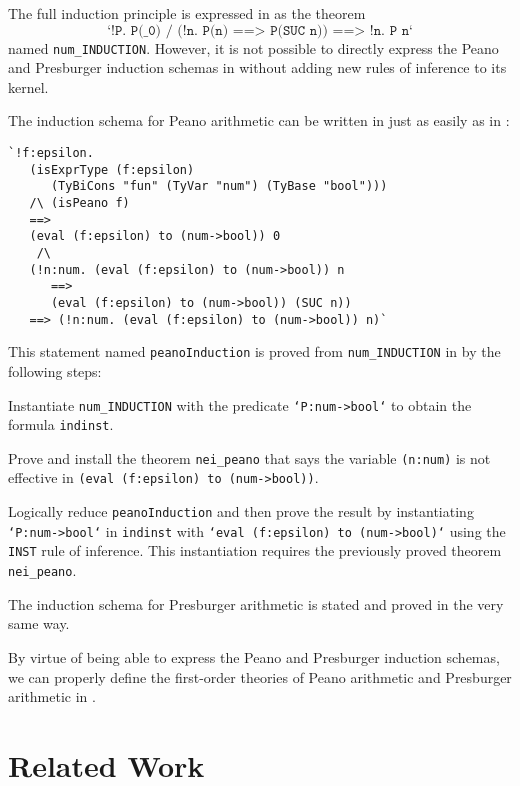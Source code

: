 \documentclass[fleqn]{llncs}
\begin{document}
The full induction principle is expressed in {\HL} as the
theorem \[\texttt{`!P. P(\_0) /\ (!n. P(n) ==> P(SUC n)) ==> !n. P
  n`}\] named \texttt{num\_INDUCTION}.  However, it is not possible to
directly express the Peano and Presburger induction schemas in {\HL}
without adding new rules of inference to its kernel.

\bsp
The induction schema for Peano arithmetic can be written in
{\HLQE} just as easily as in {\churchqe}:
\begin{lstlisting}
`!f:epsilon. 
   (isExprType (f:epsilon) 
      (TyBiCons "fun" (TyVar "num") (TyBase "bool"))) 
   /\ (isPeano f) 
   ==> 
   (eval (f:epsilon) to (num->bool)) 0 
    /\ 
   (!n:num. (eval (f:epsilon) to (num->bool)) n 
      ==> 
      (eval (f:epsilon) to (num->bool)) (SUC n)) 
   ==> (!n:num. (eval (f:epsilon) to (num->bool)) n)`
\end{lstlisting}
\esp

This statement named \texttt{peanoInduction} is proved from
\texttt{num\_INDUCTION} in {\HLQE} by the following steps:

\bsp
\be

  \item Instantiate \texttt{num\_INDUCTION} with the predicate
    \texttt{`P:num->bool`} to obtain the formula \texttt{indinst}.

  \item Prove and install the theorem \texttt{nei\_peano} that says the
    variable \texttt{(n:num)} is not effective in \texttt{(eval
      (f:epsilon) to (num->bool))}.

  \item Logically reduce \texttt{peanoInduction} and then prove the
    result by instantiating \texttt{`P:num->bool`} in \texttt{indinst}
    with \texttt{`eval (f:epsilon) to (num->bool)`} using the
    \texttt{INST} rule of inference.  This instantiation requires the
    previously proved theorem \texttt{nei\_peano}.

\ee 
\esp 

\noindent 
The induction schema for Presburger arithmetic is stated and proved in
the very same way.

By virtue of being able to express the Peano and Presburger induction
schemas, we can properly define the first-order theories of Peano
arithmetic and Presburger arithmetic in {\HLQE}.

\section{Related Work}\label{sec:related-work}
\end{document}
